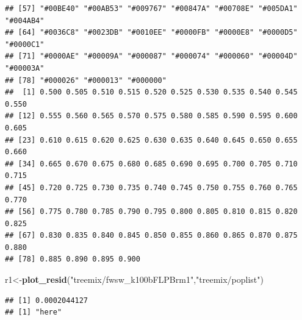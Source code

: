 \documentclass[]{article}
\newenvironment{Shaded}{\begin{snugshade}}{\end{snugshade}}
\newcommand{\KeywordTok}[1]{\textcolor[rgb]{0.13,0.29,0.53}{\textbf{#1}}}
\newcommand{\StringTok}[1]{\textcolor[rgb]{0.31,0.60,0.02}{#1}}
\newcommand{\NormalTok}[1]{#1}
\begin{document}
\begin{verbatim}
## [57] "#00BE40" "#00AB53" "#009767" "#00847A" "#00708E" "#005DA1" "#004AB4"
## [64] "#0036C8" "#0023DB" "#0010EE" "#0000FB" "#0000E8" "#0000D5" "#0000C1"
## [71] "#0000AE" "#00009A" "#000087" "#000074" "#000060" "#00004D" "#00003A"
## [78] "#000026" "#000013" "#000000"
##  [1] 0.500 0.505 0.510 0.515 0.520 0.525 0.530 0.535 0.540 0.545 0.550
## [12] 0.555 0.560 0.565 0.570 0.575 0.580 0.585 0.590 0.595 0.600 0.605
## [23] 0.610 0.615 0.620 0.625 0.630 0.635 0.640 0.645 0.650 0.655 0.660
## [34] 0.665 0.670 0.675 0.680 0.685 0.690 0.695 0.700 0.705 0.710 0.715
## [45] 0.720 0.725 0.730 0.735 0.740 0.745 0.750 0.755 0.760 0.765 0.770
## [56] 0.775 0.780 0.785 0.790 0.795 0.800 0.805 0.810 0.815 0.820 0.825
## [67] 0.830 0.835 0.840 0.845 0.850 0.855 0.860 0.865 0.870 0.875 0.880
## [78] 0.885 0.890 0.895 0.900
\end{verbatim}

\begin{Shaded}
\begin{Highlighting}[]
\NormalTok{r1<-}\KeywordTok{plot_resid}\NormalTok{(}\StringTok{"treemix/fwsw_k100bFLPBrm1"}\NormalTok{,}\StringTok{"treemix/poplist"}\NormalTok{)}
\end{Highlighting}
\end{Shaded}

\begin{verbatim}
## [1] 0.0002044127
## [1] "here"
\end{verbatim}
\end{document}
